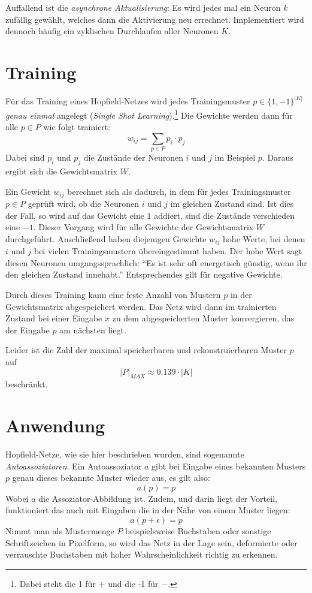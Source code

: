 Auffallend ist die \emph{asynchrone Aktualisierung}: Es wird jedes mal ein Neuron $k$ zufällig gewählt, welches dann die Aktivierung neu errechnet. Implementiert wird dennoch häufig ein zyklischen Durchlaufen aller Neuronen $K$.




\section*{Training}
Für das Training eines Hopfield-Netzes wird jedes Trainingsmuster $p \in \{1,-1\}^{|K|}$ \emph{genau einmal} angelegt (\emph{Single Shot Learning}).\footnote{Dabei steht die 1 für $+$ und die -1 für $-$.}
Die Gewichte werden dann für alle $p \in P$ wie folgt trainiert:
\[
	w_{ij} = \sum_{p \in P} p_i \cdot p_j
\]
Dabei sind $p_i$ und $p_j$ die Zustände der Neuronen $i$ und $j$ im Beispiel $p$. Daraus ergibt sich die Gewichtsmatrix $W$.

Ein Gewicht $w_{ij}$ berechnet sich als dadurch, in dem für jedes Trainingsmuster $p \in P$ geprüft wird, ob die Neuronen $i$ und $j$ im gleichen Zustand sind. Ist dies der Fall, so wird auf das Gewicht eine $1$ addiert, sind die Zustände verschieden eine $-1$.
Dieser Vorgang wird für alle Gewichte der Gewichtsmatrix $W$ durchgeführt. Anschließend haben diejenigen Gewichte $w_{ij}$ hohe Werte, bei denen $i$ und $j$ bei vielen Trainingsmustern übereingestimmt haben.
Der hohe Wert sagt diesen Neuronen umgangssprachlich: "`Es ist sehr oft energetisch günstig, wenn ihr den gleichen Zustand innehabt."' Entsprechendes gilt für negative Gewichte.

Durch dieses Training kann eine feste Anzahl von Mustern $p$ in der Gewichtsmatrix abgespeichert werden. Das Netz wird dann im trainierten Zustand bei einer Eingabe $x$ zu dem abgespeicherten Muster konvergieren, das der Eingabe $p$ am nächsten liegt.

Leider ist die Zahl der maximal speicherbaren und rekonstruierbaren Muster $p$ auf
\[
	|P|_{MAX} \approx 0.139 \cdot |K|
\]
\noindent
beschränkt.




\section*{Anwendung}
Hopfield-Netze, wie sie hier beschrieben wurden, sind sogenannte \emph{Autoassoziatoren}. Ein Autoassoziator $a$ gibt bei Eingabe eines bekannten Musters $p$ genau dieses bekannte Muster wieder aus, es gilt also:
\[
	a(p) = p
\]
Wobei $a$ die Assoziator-Abbildung ist. Zudem, und darin liegt der Vorteil, funktioniert das auch mit Eingaben die in der Nähe von einem Muster liegen:
\[
	a(p + \epsilon) = p
\]
Nimmt man als Mustermenge $P$ beispielsweise Buchstaben oder sonstige Schriftzeichen in Pixelform, so wird das Netz in der Lage sein, deformierte oder verrauschte Buchstaben mit hoher Wahrscheinlichkeit richtig zu erkennen.

